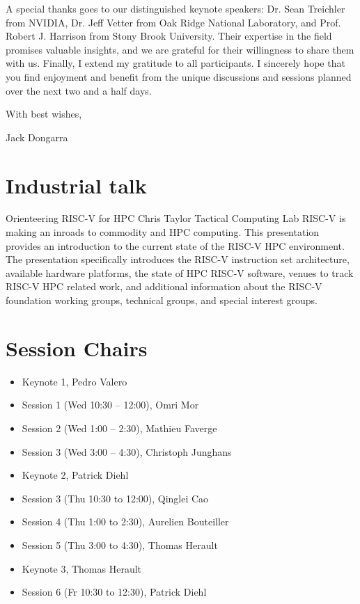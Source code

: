 \documentclass[12pt,letterpaper]{book}
\newenvironment{conf-abstract}[4][]{
 \needspace{10\baselineskip}
 \begin{center}
 { \renewcommand\textsuperscript[1]{}
 \phantomsection\addcontentsline{toc}{section}
 {\texorpdfstring{#2 (\emph{#3})}{#2 (#3)}}
 }
 {{\large\bfseries #2}\marginnote{#1}\par}
 \medskip
 {#3\par}
 \smallskip
 {\small #4\par}
 \end{center}
}{%
 \bigskip
 \hrule
 \bigskip
}
\begin{document}
\noindent A special thanks goes to our distinguished keynote speakers: Dr. Sean
Treichler from NVIDIA, Dr. Jeff Vetter from Oak Ridge National
Laboratory, and Prof. Robert J. Harrison from Stony Brook University.
Their expertise in the field promises valuable insights, and we are
grateful for their willingness to share them with us. Finally, I extend
my gratitude to all participants. I sincerely hope that you find
enjoyment and benefit from the unique discussions and sessions planned
over the next two and a half days.

\noindent With best wishes,

Jack Dongarra


%

\newpage



\tableofcontents

\mainmatter

\chapter{Industrial talk}

\begin{conf-abstract}[15$^{th}$]
{Orienteering RISC-V for HPC}
{Chris Taylor}
{Tactical Computing Lab}
RISC-V is making an inroads to commodity and HPC computing. This presentation provides an introduction to the current state of the RISC-V HPC environment.
The presentation specifically introduces the RISC-V instruction set architecture, available hardware platforms, the state of HPC RISC-V software, venues to track RISC-V HPC related work, and additional information about the RISC-V foundation working groups, technical groups, and special interest groups.
\end{conf-abstract}

\chapter{Session Chairs}

\begin{itemize}
\item Keynote 1, Pedro Valero
\item Session 1 (Wed 10:30 -- 12:00), Omri Mor
\item Session 2 (Wed 1:00 -- 2:30),  Mathieu Faverge
\item Session 3 (Wed 3:00 -- 4:30), Christoph Junghans
\item Keynote 2, Patrick Diehl
\item Session 3 (Thu 10:30 to 12:00), Qinglei Cao
\item Session 4 (Thu 1:00 to 2:30), Aurelien Bouteiller
\item Session 5 (Thu 3:00 to 4:30), Thomas Herault
\item Keynote 3, Thomas Herault
\item Session 6 (Fr 10:30 to 12:30), Patrick Diehl
\end{itemize}
\end{document}
